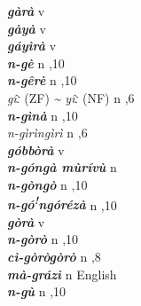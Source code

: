 \begin{multicols}{2}
{{\bfseries\itshape gàrà}} \relax  v  \relax   \relax  {} \relax   \relax  \\
{{\bfseries\itshape gàyà}} \relax  v  \relax   \relax  {} \relax   \relax  \\
{{\bfseries\itshape gáyìrà}} \relax  v  \relax   \relax  {} \relax   \relax  \\
{{\bfseries\itshape n-gè}} \relax  n  ,10  \relax   \relax  \\
{{\bfseries\itshape n-gêrè}} \relax  n  ,10  \relax   \relax  \\
{\textit{gîː} (ZF) \textit{{\textasciitilde} yîː} (NF)} \relax  n  ,6  \relax   \relax  \\
{{\bfseries\itshape n-gìnà}} \relax  n  ,10  \relax   \relax  \\
{\textit{n-gìrìngìrì}} \relax  n  ,6  \relax   \relax  \\
{{\bfseries\itshape góbbòrà}} \relax  v  \relax   \relax  {} \relax   \relax  \\
{{\bfseries\itshape n-góngà mùrívù}} \relax  n   \relax  {} \relax   \relax  \\
{{\bfseries\itshape n-gòngò}} \relax  n  ,10  \relax   \relax  \\
{{\bfseries\itshape n-gó\textsuperscript{!}ngórézà}} \relax  n  ,10  \relax   \relax  \\
{{\bfseries\itshape gòrà}} \relax  v  \relax   \relax  {} \relax   \relax  \\
{{\bfseries\itshape n-gòrò}} \relax  n  ,10  \relax   \relax  \\
{{\bfseries\itshape cì-gòrògòrò}} \relax  n  ,8  \relax   \relax  \\
{{\bfseries\itshape mà-grázì}} \relax  n   \relax  {} \relax  English \relax  \\
{{\bfseries\itshape n-gù}} \relax  n  ,10  \relax   \relax  \\

\end{multicols}
